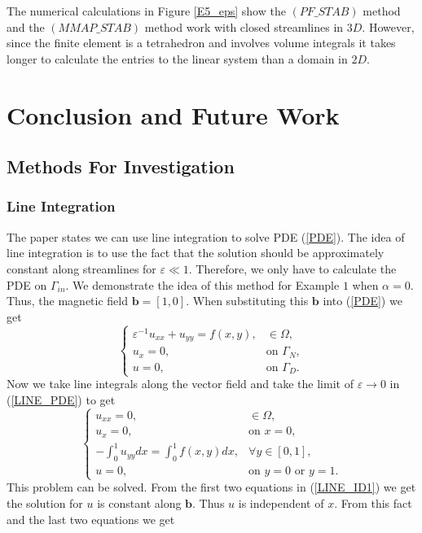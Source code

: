 \documentclass[12pt]{ociamthesis}
\begin{document}
The numerical calculations in Figure \ref{E5_eps} show the $(PF\_STAB)$ method and the $(MMAP\_STAB)$ method work with closed streamlines in $3D$. However, since the finite element is a tetrahedron and involves volume integrals it takes longer to calculate the entries to the linear system than a domain in $2D$.

\chapter{Conclusion and Future Work}

\section{Methods For Investigation}

\subsection{Line Integration}
The paper \cite{LINE_INT} states we can use line integration to solve PDE (\ref{PDE}).  The idea of line integration is to use the fact that the solution should be approximately constant along streamlines for $\varepsilon \ll 1$. Therefore, we only have to calculate the PDE on $\Gamma_{in}$. We demonstrate the idea of this method for Example $1$ when $\alpha=0$. Thus, the magnetic field $\mathbf{b} = [1, 0]$. When substituting this $\mathbf{b}$ into (\ref{PDE}) we get 
\begin{equation} \label{LINE_PDE}
\begin{cases}
\varepsilon^{-1}u_{xx} + u_{yy} = f(x,y), &\in \Omega,\\
u_x = 0, &\text{on } \Gamma_{N},\\
u = 0, &\text{on } \Gamma_{D}.
\end{cases}
\end{equation}
Now we take line integrals along the vector field and take the limit of $\varepsilon \rightarrow 0$ in (\ref{LINE_PDE}) to get
\begin{equation} \label{LINE_ID1}
\begin{cases}
u_{xx} = 0, &\in \Omega,\\
u_{x} = 0, & \text{on }x=0,\\
-\int_0^1 u_{yy} dx = \int_0^1f(x,y)dx, &\forall y \in [0,1],\\
u = 0, &\text{on } y=0 \text{ or } y=1.
\end{cases}
\end{equation}
This problem can be solved. From the first two equations in (\ref{LINE_ID1}) we get the solution for $u$ is constant along $\mathbf{b}$. Thus $u$ is independent of $x$. From this fact and the last two equations we get
\end{document}
